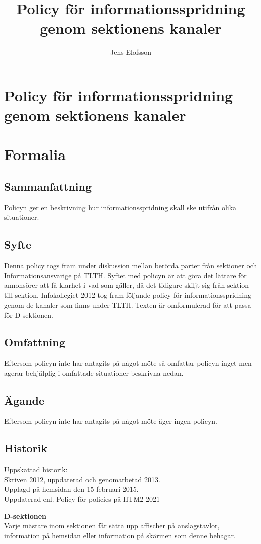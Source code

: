 \documentclass{dsekprotokoll}
\title{Policy för informationsspridning genom sektionens kanaler}
\author{Jens Elofsson}
\begin{document}
\section*{Policy för informationsspridning genom sektionens kanaler}
\section{Formalia}
\subsection{Sammanfattning}
Policyn ger en beskrivning hur informationsspridning skall ske utifrån olika situationer.
\subsection{Syfte}
Denna policy togs fram under diskussion mellan berörda parter från sektioner och Informationsansvarige på TLTH. Syftet med policyn är att göra det lättare för annonsörer att få klarhet i vad som gäller, då det tidigare skiljt sig från sektion till sektion. Infokollegiet 2012 tog fram följande policy för informationsspridning genom de kanaler som finns under TLTH. Texten är omformulerad för att passa för D-sektionen.

\subsection{Omfattning}
Eftersom policyn inte har antagits på något möte så omfattar policyn inget men agerar behjälplig i omfattade situationer beskrivna nedan.
\subsection{Ägande}
Eftersom policyn inte har antagits på något möte äger ingen policyn.
\subsection{Historik}
Uppskattad historik:\\
Skriven 2012, uppdaterad och genomarbetad 2013. \\
Upplagd på hemsidan den 15 februari 2015. \\
Uppdaterad enl. Policy för policies på HTM2 2021


\textbf{D-sektionen}\\
Varje mästare inom sektionen får sätta upp affischer på anslagstavlor, information på
hemsidan eller information på skärmen som denne behagar.
\end{document}
